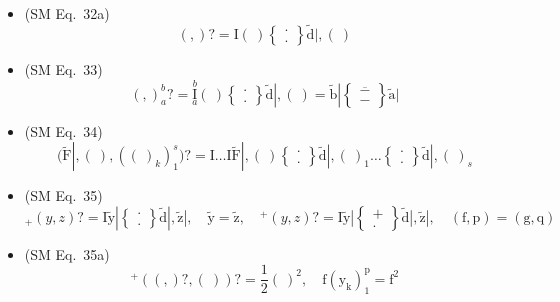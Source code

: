\documentclass[
    12pt,              %
    a4paper,           %
    headings=normal,   %
    twoside=true,      %
    BCOR=8mm,          %
]{scrbook}
\begin{document}
\begin{itemize}[label={},leftmargin=0pt]
    \item (SM Eq.\ 32a) 
    \[
    ( , )? = \mathrm{I}(\ ) \left\{ \begin{smallmatrix} \cdot \\ . \end{smallmatrix} \right\} \tilde{\mathrm{d}}|, (\ )
    \]

    \item (SM Eq.\ 33) 
    \[
    ( , )_a^b? = \overset{b}{\underset{a}{\mathrm{I}}} (\ ) \left\{ \begin{smallmatrix} \cdot \\ . \end{smallmatrix} \right\} \tilde{\mathrm{d}}|, (\ ) = \tilde{\mathrm{b}}| \left\{ \begin{smallmatrix} \overline{-} \\ - \end{smallmatrix} \right\} \tilde{\mathrm{a}}|
    \]

    \item (SM Eq.\ 34) 
    \[
    (\tilde{\mathrm{F}}|, (\ ), ( (\ )_k )_1^s)? = \mathrm{I} \dots \mathrm{I} \tilde{\mathrm{F}}|, (\ ) \left\{ \begin{smallmatrix} \cdot \\ . \end{smallmatrix} \right\} \tilde{\mathrm{d}}|, (\ )_1 \dots \left\{ \begin{smallmatrix} \cdot \\ . \end{smallmatrix} \right\} \tilde{\mathrm{d}}|, (\ )_s
    \]

    \item (SM Eq.\ 35) 
    \[
    {}_+(y,z)? = \mathrm{I} \tilde{\mathrm{y}}| \left\{ \begin{smallmatrix} \cdot \\ . \end{smallmatrix} \right\} \tilde{\mathrm{d}}|, \tilde{\mathrm{z}}|, \quad \tilde{\mathrm{y}} = \tilde{\mathrm{z}}, \quad {}^+(y,z)? = \mathrm{I} \tilde{\mathrm{y}}| \left\{ \begin{smallmatrix} + \\ . \end{smallmatrix} \right\} \tilde{\mathrm{d}}|, \tilde{\mathrm{z}}|, \quad (\mathrm{f}, \mathrm{p}) = (\mathrm{g}, \mathrm{q})
    \]

    \item (SM Eq.\ 35a) 
    \[
    {}^+( ( , )?, (\ ) )? = \frac{1}{2}(\ )^2, \quad \mathrm{f}(\mathrm{y_k})_1^\mathrm{p} = \mathrm{f}^2
    \]


\end{itemize}
\end{document}
